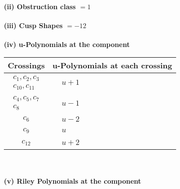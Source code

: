 \documentclass[1p]{elsarticle_modified}
\theoremstyle{definition}
\begin{document}
\flushleft \textbf{(ii) Obstruction class $= 1$}\\~\\
\flushleft \textbf{(iii) Cusp Shapes $= -12$}\\~\\
\newpage\renewcommand{\arraystretch}{1}
\flushleft \textbf{(iv) u-Polynomials at the component}\newline \\
\begin{tabular}{m{50pt}|m{274pt}}
Crossings & \hspace{64pt}u-Polynomials at each crossing \\
\hline $$\begin{aligned}c_{1},c_{2},c_{3}\\c_{10},c_{11}\end{aligned}$$&$\begin{aligned}
&u+1
\end{aligned}$\\
\hline $$\begin{aligned}c_{4},c_{5},c_{7}\\c_{8}\end{aligned}$$&$\begin{aligned}
&u-1
\end{aligned}$\\
\hline $$\begin{aligned}c_{6}\end{aligned}$$&$\begin{aligned}
&u-2
\end{aligned}$\\
\hline $$\begin{aligned}c_{9}\end{aligned}$$&$\begin{aligned}
&u
\end{aligned}$\\
\hline $$\begin{aligned}c_{12}\end{aligned}$$&$\begin{aligned}
&u+2
\end{aligned}$\\
\hline
\end{tabular}\\~\\
\newpage\renewcommand{\arraystretch}{1}
\flushleft \textbf{(v) Riley Polynomials at the component}\newline \\
\end{document}

